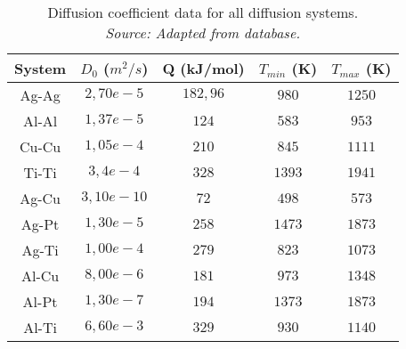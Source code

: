 \begin{table}[H]
    \centering
    \begin{tabular}{ccccc}
        System & $D_0$ ($m^2/s$) & Q (kJ/mol) & $T_{min}$ (K) & $T_{max}$ (K) \\ \hline \hline
        Ag-Ag & $2,70e-5$ & $182,96$ & $980$ & $1250$\\
        Al-Al & $1,37e-5$ & $124$ & $583$ & $953$ \\
        Cu-Cu & $1,05e-4$ & $210$ & $845$ & $1111$\\
        Ti-Ti & $3,4e-4$ & $328$ & $1393$ & $1941$ \\
        Ag-Cu & $3,10e-10$ & $72$ & $498$ & $573$\\
        Ag-Pt & $1,30e-5$ & $258$ & $1473$ & $1873$\\
        Ag-Ti & $1,00e-4$ & $279$ & $823$ & $1073$ \\
        Al-Cu & $8,00e-6$ & $181$ & $973$ & $1348$ \\
        Al-Pt & $1,30e-7$ & $194$ & $1373$ & $1873$\\
        Al-Ti & $6,60e-3$ & $329$ & $930$ & $1140$
    \end{tabular}
    \caption{Diffusion coefficient data for all diffusion systems. \\
    \textit{Source: Adapted from \citep{kakusan} database.}}
    \label{tab:tabla2}
\end{table}